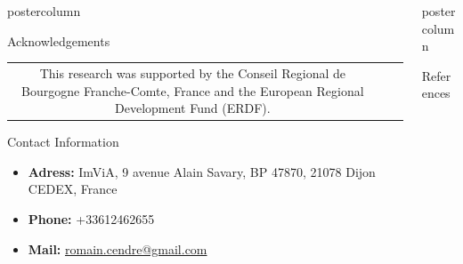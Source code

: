 \documentclass[final]{beamer}
\newlength{\columnheight}
\begin{document}
\begin{frame}
\begin{columns}[t]
\begin{column}{.49\textwidth}
\begin{beamercolorbox}[center,wd=\textwidth]{postercolumn}
\begin{minipage}[T]{.95\textwidth}
{\begin{block}{Acknowledgements}
\begin{center}
\begin{tabular}{SSL}
        				    \footnotesize This research was supported by the Conseil Regional de Bourgogne Franche-Comte, France and the European Regional Development Fund (ERDF).
        				\end{tabular}
    				\end{center}
    			\end{block}
                \vspace{0.9in}
                \begin{block}{Contact Information}
    				\footnotesize
    				\begin{itemize}
    				    \item \textbf{Adress:} ImViA, 9 avenue Alain Savary, BP 47870, 21078 Dijon CEDEX, France
    					\item \textbf{Phone:} +33612462655
    					\item \textbf{Mail:} \href{mailto:romain.cendre@gmail.com}{romain.cendre@gmail.com}
    				\end{itemize}	
    			\end{block}
            }
        \end{minipage}
    \end{beamercolorbox}    
	\end{column}
	
	\begin{column}{.49\textwidth}
	\begin{beamercolorbox}[center,wd=\textwidth]{postercolumn}
        \begin{minipage}[T]{.95\textwidth}  %
          \parbox[t][\columnheight]{\textwidth}{
            \begin{block}{References}
                \footnotesize 
                
                
            \end{block}
            }
        \end{minipage}
    \end{beamercolorbox}    
	\end{column}
  \end{columns}
    
\end{frame}
\end{document}
